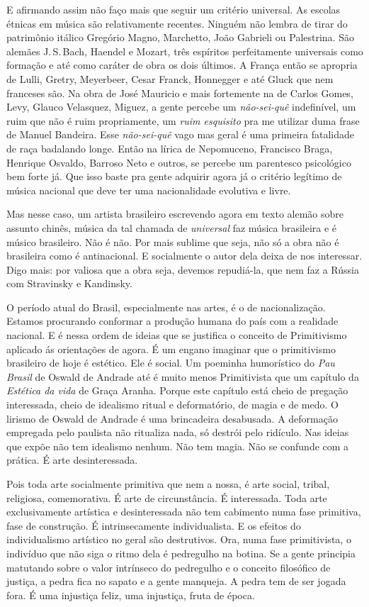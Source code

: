 E afirmando assim não faço mais que seguir um critério universal. As
escolas étnicas em música são relativamente recentes. Ninguém não lembra
de tirar do patrimônio itálico Gregório Magno, Marchetto, João Gabrieli
ou Palestrina. São alemães {J.\,S.}\,Bach, Haendel e Mozart, três espíritos
perfeitamente universais como formação e até como caráter de obra os
dois últimos. A França então se apropria de Lulli, Gretry, Meyerbeer,
Cesar Franck, Honnegger e até Gluck que nem franceses são. Na obra de
José Mauricio e mais fortemente na de Carlos Gomes, Levy, Glauco
Velasquez, Miguez, a gente percebe um \textit{não-sei-quê} indefinível, um ruim
que não é ruim propriamente, um \textit{ruim esquisito} pra me utilizar
duma frase de Manuel Bandeira. Esse \textit{não-sei-quê} vago mas geral é uma
primeira fatalidade de raça badalando longe. Então na lírica de
Nepomuceno, Francisco Braga, Henrique Osvaldo, Barroso Neto e outros, se
percebe um parentesco psicológico bem forte já. Que isso baste pra gente
adquirir agora já o critério legítimo de música nacional que deve ter
uma nacionalidade evolutiva e livre.

Mas nesse caso, um artista brasileiro escrevendo agora em texto alemão
sobre assunto chinês, música da tal chamada de \textit{universal} faz
música brasileira e é músico brasileiro. Não é não. Por mais sublime que
seja, não só a obra não é brasileira como é antinacional. E socialmente
o autor dela deixa de nos interessar. Digo mais: por valiosa que a obra
seja, devemos repudiá-la, que nem faz a Rússia com Stravinsky e
Kandinsky.

O período atual do Brasil, especialmente nas artes, é o de
nacionalização. Estamos procurando conformar a produção humana do país
com a realidade nacional. E é nessa ordem de ideias que se justifica o
conceito de Primitivismo aplicado ás orientações de agora. É um engano
imaginar que o primitivismo brasileiro de hoje é estético. Ele é social.
Um poeminha humorístico do \textit{Pau Brasil} de Oswald de Andrade até é
muito menos Primitivista que um capítulo da \textit{Estética da vida} de
Graça Aranha. Porque este capítulo está cheio de pregação interessada,
cheio de idealismo ritual e deformatório, de magia e de medo. O lirismo
de Oswald de Andrade é uma brincadeira desabusada. A deformação
empregada pelo paulista não ritualiza nada, só destrói pelo ridículo.
Nas ideias que expõe não tem idealismo nenhum. Não tem magia. Não se
confunde com a prática. É arte desinteressada.

Pois toda arte socialmente primitiva que nem a nossa, é arte social,
tribal, religiosa, comemorativa. É arte de circunstância. É interessada.
Toda arte exclusivamente artística e desinteressada não tem cabimento
numa fase primitiva, fase de construção. É intrinsecamente
individualista. E os efeitos do individualismo artístico no geral são
destrutivos. Ora, numa fase primitivista, o indivíduo que não siga o
ritmo dela é pedregulho na botina. Se a gente principia matutando sobre
o valor intrínseco do pedregulho e o conceito filosófico de justiça, a
pedra fica no sapato e a gente manqueja. A pedra tem de ser jogada
fora. É uma injustiça feliz, uma injustiça, fruta de época.

